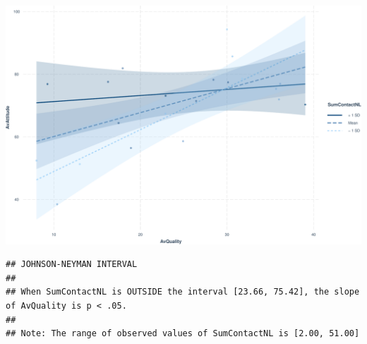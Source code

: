 \begin{Shaded}
\begin{Highlighting}[]
\SpecialCharTok{$}\OtherTok{\textless{}{-}}
\SpecialCharTok{::}\SpecialCharTok{$} \NormalTok{)}

\SpecialCharTok{::}\NormalTok{(}
\SpecialCharTok{$}
   \NormalTok{,}
   
\NormalTok{)}
\end{Highlighting}
\end{Shaded}

\includegraphics{Figures/workerModelOlsAttFreqQual-1.pdf}

\begin{Shaded}
\begin{Highlighting}[]
\SpecialCharTok{::}\SpecialCharTok{$}
                             \NormalTok{)}
\end{Highlighting}
\end{Shaded}

\begin{verbatim}
## JOHNSON-NEYMAN INTERVAL 
## 
## When SumContactNL is OUTSIDE the interval [23.66, 75.42], the slope of AvQuality is p < .05.
## 
## Note: The range of observed values of SumContactNL is [2.00, 51.00]
\end{verbatim}

